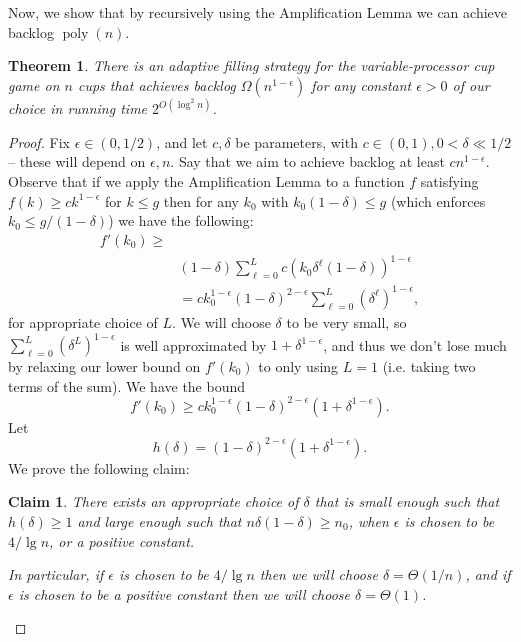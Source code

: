 \documentclass[twocolumn]{article}[10pt]
\DeclareMathOperator{\poly}{\text{poly}}
\newtheorem{clm}{Claim}
\newtheorem{theorem}{Theorem}
\begin{document}
Now, we show that by recursively using the Amplification Lemma we can achieve backlog $\poly(n)$.
\begin{theorem}
  \label{thm:adaptivePoly}
  There is an adaptive filling strategy for the variable-processor cup game on
  $n$ cups that achieves backlog $\Omega(n^{1-\epsilon})$ for any constant
  $\epsilon > 0$ of our choice in running time $2^{O(\log^2 n)}$.
\end{theorem}
\begin{proof}
  Fix $\epsilon \in (0,1/2)$, and let $c, \delta$ be parameters, with $c\in
  (0,1), 0 < \delta \ll 1/2$ -- these will depend on $\epsilon, n$.
  Say that we aim to achieve backlog at least $cn^{1-\epsilon}$.
  Observe that if we apply the Amplification Lemma to a function $f$ satisfying
  $f(k) \ge ck^{1-\epsilon}$ for $k \le g$ then for any $k_0$ with
  $k_0(1-\delta)\le g$ (which enforces $k_0 \le g/ (1-\delta)$) we have the
  following:
  \begin{align*}
  f'(k_0)\ge&\\
  &(1-\delta)\sum_{\ell=0}^L c (k_0\delta^\ell(1-\delta))^{1-\epsilon}\\
  &= ck_0^{1-\epsilon} (1-\delta)^{2-\epsilon} \sum_{\ell=0}^L (\delta^\ell)^{1-\epsilon},
  \end{align*}
  for appropriate choice of $L$.
  We will choose $\delta$ to be very small, so $\sum_{\ell=0}^L
  (\delta^L)^{1-\epsilon}$ is well approximated by
  $1+\delta^{1-\epsilon}$, and thus we don't lose much by relaxing our lower
  bound on $f'(k_0)$ to only using $L=1$ (i.e. taking two terms of the sum). We have the bound
  $$f'(k_0) \ge ck_0^{1-\epsilon}(1-\delta)^{2-\epsilon}(1+\delta^{1-\epsilon}).$$
  Let 
  $$h(\delta) = (1-\delta)^{2-\epsilon}(1+\delta^{1-\epsilon}).$$
  We prove the following claim:

  \begin{clm}
    \label{clm:validchoices}
    There exists an appropriate choice of $\delta$ that is small enough such
    that $h(\delta) \ge 1$ and large enough such that $n\delta(1-\delta) \ge
    n_0$, when $\epsilon$ is chosen to be $4/\lg n$, or a positive constant. 

    In particular, if $\epsilon$ is chosen to be $4/\lg n$ then we will choose
    $\delta =\Theta(1/n)$, and if $\epsilon$ is chosen to be a positive
    constant then we will choose $\delta = \Theta(1)$.
  \end{clm}


\end{proof}
\end{document}
